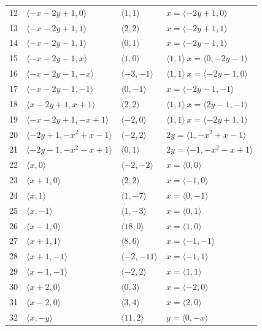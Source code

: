 \documentclass[11pt]{article}
\begin{document}
\begin{longtable}{@{}rlll@{}}
12 & $\langle -x-2y+1,0\rangle$ & $\langle 1,1\rangle$ & $x=\langle -2y+1,0\rangle$\\
13 & $\langle -x-2y+1,1\rangle$ & $\langle 2,2\rangle$ & $x=\langle -2y+1,1\rangle$\\
14 & $\langle -x-2y-1,1\rangle$ & $\langle 0,1\rangle$ & $x=\langle -2y-1,1\rangle$\\
15 & $\langle -x-2y-1,x\rangle$ & $\langle 1,0\rangle$ & $\langle 1,1\rangle\,x=\langle 0,-2y-1\rangle$\\
16 & $\langle -x-2y-1,-x\rangle$ & $\langle -3,-1\rangle$ & $\langle 1,1\rangle\,x=\langle -2y-1,0\rangle$\\
17 & $\langle -x-2y-1,-1\rangle$ & $\langle 0,-1\rangle$ & $x=\langle -2y-1,-1\rangle$\\
18 & $\langle x-2y+1,x+1\rangle$ & $\langle 2,2\rangle$ & $\langle 1,1\rangle\,x=\langle 2y-1,-1\rangle$\\
19 & $\langle -x-2y+1,-x+1\rangle$ & $\langle -2,0\rangle$ & $\langle 1,1\rangle\,x=\langle -2y+1,1\rangle$\\
20 & $\langle -2y+1,-x^{2}+x-1\rangle$ & $\langle -2,2\rangle$ & $2y=\langle 1,-x^{2}+x-1\rangle$\\
21 & $\langle -2y-1,-x^{2}-x+1\rangle$ & $\langle 0,1\rangle$ & $2y=\langle -1,-x^{2}-x+1\rangle$\\
22 & $\langle x,0\rangle$ & $\langle -2,-2\rangle$ & $x=\langle 0,0\rangle$\\
23 & $\langle x+1,0\rangle$ & $\langle 2,2\rangle$ & $x=\langle -1,0\rangle$\\
24 & $\langle x,1\rangle$ & $\langle 1,-7\rangle$ & $x=\langle 0,-1\rangle$\\
25 & $\langle x,-1\rangle$ & $\langle 1,-3\rangle$ & $x=\langle 0,1\rangle$\\
26 & $\langle x-1,0\rangle$ & $\langle 18,0\rangle$ & $x=\langle 1,0\rangle$\\
27 & $\langle x+1,1\rangle$ & $\langle 8,6\rangle$ & $x=\langle -1,-1\rangle$\\
28 & $\langle x+1,-1\rangle$ & $\langle -2,-11\rangle$ & $x=\langle -1,1\rangle$\\
29 & $\langle x-1,-1\rangle$ & $\langle -2,2\rangle$ & $x=\langle 1,1\rangle$\\
30 & $\langle x+2,0\rangle$ & $\langle 0,3\rangle$ & $x=\langle -2,0\rangle$\\
31 & $\langle x-2,0\rangle$ & $\langle 3,4\rangle$ & $x=\langle 2,0\rangle$\\
32 & $\langle x,-y\rangle$ & $\langle 11,2\rangle$ & $y=\langle 0,-x\rangle$\\

\end{longtable}
\end{document}
